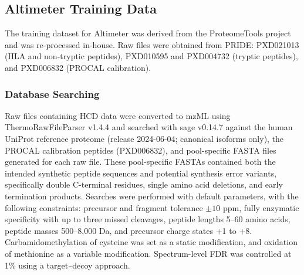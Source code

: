 \documentclass[pdflatex,sn-nature]{sn-jnl}
\begin{document}
\subsection{Altimeter Training Data}\label{subsec:altimeter-training-data}
The training dataset for Altimeter was derived from the ProteomeTools project and was re-processed in-house. Raw files were obtained from PRIDE: PXD021013 (HLA and non-tryptic peptides), PXD010595 and PXD004732 (tryptic peptides), and PXD006832 (PROCAL calibration).

\subsubsection{Database Searching}\label{subsubsec:database-searching}
Raw files containing HCD data were converted to mzML using ThermoRawFileParser v1.4.4 and searched with sage v0.14.7 against the human UniProt reference proteome (release 2024-06-04; canonical isoforms only), the PROCAL calibration peptides (PXD006832), and pool-specific FASTA files generated for each raw file. These pool-specific FASTAs contained both the intended synthetic peptide sequences and potential synthesis error variants, specifically double C-terminal residues, single amino acid deletions, and early termination products.
Searches were performed with default parameters, with the following constraints: precursor and fragment tolerance $\pm10$ ppm, fully enzymatic specificity with up to three missed cleavages, peptide lengths 5–60 amino acids, peptide masses 500–8,000 Da, and precursor charge states +1 to +8. Carbamidomethylation of cysteine was set as a static modification, and oxidation of methionine as a variable modification. Spectrum-level FDR was controlled at 1\% using a target–decoy approach.

\end{document}
